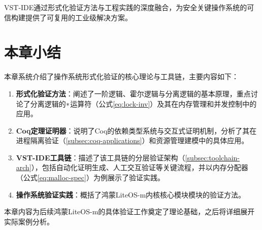 \noindent VST-IDE通过形式化验证方法与工程实践的深度融合，为安全关键操作系统的可信构建提供了可复用的工业级解决方案。
\section*{本章小结}
\label{sec:chapter-summary}

\noindent 本章系统介绍了操作系统形式化验证的核心理论与工具链，主要内容如下：

\begin{enumerate}[leftmargin=*]
    \item \textbf{形式化验证方法}：阐述了一阶逻辑、霍尔逻辑与分离逻辑的基本原理，重点讨论了分离逻辑的$\ast$运算符（公式\ref{eq:lock-inv}）及其在内存管理和并发控制中的应用。
    
    \item \textbf{Coq定理证明器}：说明了Coq的依赖类型系统与交互式证明机制，分析了其在进程隔离验证（\ref{subsec:coq-applications}）和资源管理建模中的具体应用。
    
    \item \textbf{VST-IDE工具链}：描述了该工具链的分层验证架构（\ref{subsec:toolchain-arch}），包括自动化证明生成、人工交互验证等关键流程，并以内存分配器（公式\ref{eq:malloc-spec}）为例展示了验证实践。
    
    \item \textbf{操作系统验证实践}：概括了鸿蒙LiteOS-m内核核心模块模块的验证方法。
\end{enumerate}

\noindent 本章内容为后续鸿蒙LiteOS-m的具体验证工作奠定了理论基础，之后将详细展开实际案例分析。